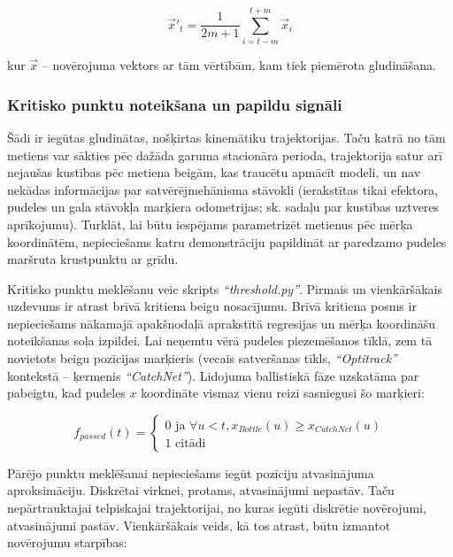 \documentclass[12pt, a4paper]{article}
\numberwithin{equation}{section} %
\begin{document}
\begin{equation}
    \vec{x}'_{t} = \frac{1}{2m+1} \sum_{i=t-m}^{t+m} \vec{x}_i
\end{equation}

kur $\vec{x}$ -- novērojuma vektors ar tām vērtībām, kam tiek piemērota gludināšana.

\subsubsection{Kritisko punktu noteikšana un papildu signāli}

Šādi ir iegūtas gludinātas, nošķirtas kinemātiku trajektorijas. Taču katrā no tām metiens var sākties pēc dažāda garuma stacionāra perioda, trajektorija satur arī nejaušas kustības pēc metiena beigām, kas traucētu apmācīt modeli, un nav nekādas informācijas par satvērējmehānisma stāvokli (ierakstītas tikai efektora, pudeles un gala stāvokļa marķiera odometrijas; sk. sadaļu par kustības uztveres aprīkojumu). Turklāt, lai būtu iespējams parametrizēt metienus pēc mērķa koordinātēm, nepieciešams katru demonstrāciju papildināt ar paredzamo pudeles maršruta krustpunktu ar grīdu. 

Kritisko punktu meklēšanu veic skripts \textit{``threshold.py''}. Pirmais un vienkāršākais uzdevums ir atrast brīvā kritiena beigu nosacījumu. Brīvā kritiena posms ir nepieciešams nākamajā apakšnodaļā aprakstītā regresijas un mērķa koordināšu noteikšanas soļa izpildei. Lai neņemtu vērā pudeles piezemēšanos tīklā, zem tā novietots beigu pozīcijas marķieris (vecais satveršanas tīkls, \textit{``Optitrack''} kontekstā -- ķermenis \textit{``CatchNet''}). Lidojuma ballistiskā fāze uzskatāma par pabeigtu, kad pudeles $x$ koordināte vismaz vienu reizi sasniegusi šo marķieri:

\begin{equation}
    f_{passed} (t) = \begin{cases}
        0 \text{ ja } \forall u < t, x_{Bottle}(u) \geq x_{CatchNet}(u) \\
        1 \text{ citādi }
    \end{cases}
\end{equation}

Pārējo punktu meklēšanai nepieciešams iegūt pozīciju atvasinājuma aproksimāciju. Diskrētai virknei, protams, atvasinājumi nepastāv. Taču nepārtrauktajai telpiskajai trajektorijai, no kuras iegūti diskrētie novērojumi, atvasinājumi pastāv. Vienkāršākais veids, kā tos atrast, būtu izmantot novērojumu starpības:
\end{document}
